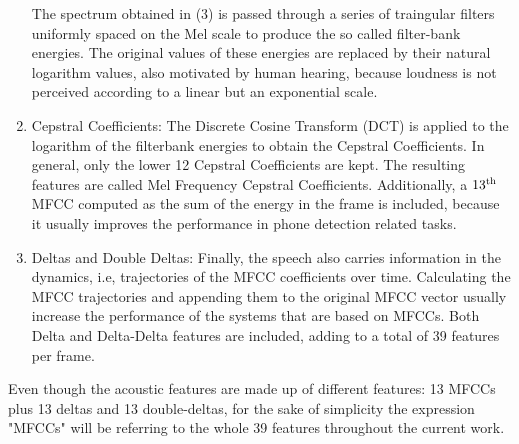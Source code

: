 \begin{enumerate}
  The spectrum obtained in (3) is passed through a series of traingular filters
  uniformly spaced on the Mel scale to produce the so called filter-bank energies.
  The original values of these energies are replaced by their natural logarithm values,
  also motivated by human hearing, because loudness is not perceived according to
  a linear but an exponential scale.

  \item Cepstral Coefficients: The Discrete Cosine Transform (DCT) is applied to the logarithm
  of the filterbank energies to obtain the Cepstral Coefficients. In general, only the lower
  12 Cepstral Coefficients are kept. The resulting features are called Mel Frequency
  Cepstral Coefficients. Additionally, a $13\textsuperscript{th}$ MFCC computed
  as the sum of the energy in the frame is included,
  because it usually improves the performance in phone detection
  related tasks.

  \item Deltas and Double Deltas: Finally, the speech also carries information
  in the dynamics, i.e, trajectories of the MFCC coefficients over time. Calculating
  the MFCC trajectories and appending them to the original MFCC vector usually increase the
  performance of the systems that are based on MFCCs.
  Both Delta and Delta-Delta features are included, adding to
  a total of 39 features per frame.

\end{enumerate}

Even though the acoustic features are made up of different features: 13 MFCCs plus 13 deltas
and 13 double-deltas, for the sake of simplicity the expression "MFCCs"
will be referring to the whole 39 features throughout the current work.
